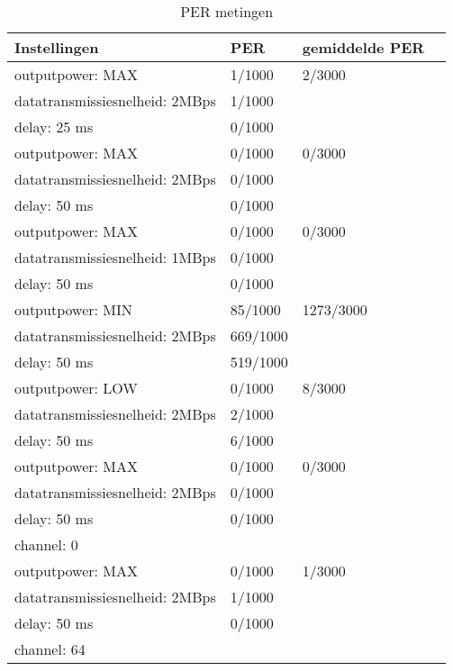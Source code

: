 \documentclass{article}
\begin{document}
\begin{table}[h]
\centering \caption{PER metingen}
\label{table:interferentieloos}
    \begin{tabular}{ | l | l | l | p{5cm} |}
    \hline
    Instellingen 				& PER 		& gemiddelde PER\\ \hline
    outputpower: MAX 			& 1/1000 	& 2/3000		\\
    datatransmissiesnelheid: 2MBps 	& 1/1000 	& 				\\
    delay: 25 ms 				& 0/1000	&  				\\ \hline

    outputpower: MAX 			& 0/1000 	& 0/3000		\\
    datatransmissiesnelheid: 2MBps 	& 0/1000 	&  				\\
    delay: 50 ms 				& 0/1000	&  				\\ \hline
   
    outputpower: MAX 			& 0/1000 	& 0/3000		\\
    datatransmissiesnelheid: 1MBps 	& 0/1000 	&  				\\
    delay: 50 ms 				& 0/1000	&  				\\ \hline
   
    outputpower: MIN 			& 85/1000 	& 1273/3000		\\ 
    datatransmissiesnelheid: 2MBps 	& 669/1000  &  				\\ 
    delay: 50 ms 				& 519/1000 	&  				\\ \hline
   
    outputpower: LOW 			& 0/1000 	& 8/3000		\\ 
    datatransmissiesnelheid: 2MBps 	& 2/1000 	&   			\\ 
    delay: 50 ms 				& 6/1000 	&  				\\ \hline
 
    outputpower: MAX 			& 0/1000 	&  0/3000		\\ 
    datatransmissiesnelheid: 2MBps 	& 0/1000 	&   			\\ 
    delay: 50 ms 				& 0/1000 	&				\\ 
    channel: 0 					&  			&  				\\ \hline
  
    outputpower: MAX 			& 0/1000 	& 1/3000		\\ 
    datatransmissiesnelheid: 2MBps 	& 1/1000 	&  				\\ 
    delay: 50 ms 				& 0/1000 	&  				\\ 
    channel: 64 				&  			&				\\ \hline
\end{tabular}
\end{table}
    
\end{document}
